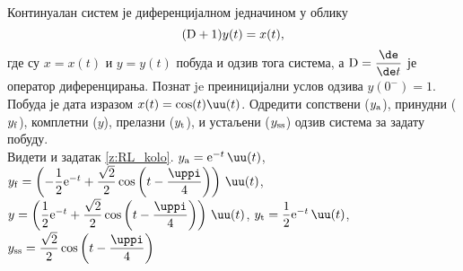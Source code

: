 \PID
Континуалан 
систем је 
диференцијалном једначином у облику 
$$
({\rm D} + 1) y(t) = x(t),
$$ где су 
$x = x(t)$ и $y = y(t)$ побуда и одзив 
тога система, а 
${\rm D} = \dfrac{\de}{\de t}$ је 
оператор диференцирања. 
Познат je преиницијални услов 
одзива $y(0^-) = 1$.
Побуда је дата изразом 
$x(t) = \cos(t) \uu(t)$. Одредити сопствени
($y_{\rm a}$), 
принудни
($y_{\rm f}$), 
комплетни
($y$), 
прелазни
($y_{\rm t}$),
 и устаљени
($y_{\rm ss}$) одзив система за задату побуду.
\\[2mm]

\REZULTAT  Видети и задатак \ref{z:RL_kolo}.
$y_{\rm a} = {\rm e}^{-t} \, \uu(t)$, 
$y_{\rm f} = 
\left( 
-\dfrac{1}{2} {\rm e}^{-t} 
+ \dfrac{\sqrt 2}{2} 
\cos
\left(
t - \dfrac{\uppi}{4}
\right)
\right)\,\uu(t)$, \\
$y = 
\left( 
\dfrac{1}{2} {\rm e}^{-t} 
+ \dfrac{\sqrt 2}{2} 
\cos
\left(
t - \dfrac{\uppi}{4}
\right)
\right)\,\uu(t)
$, 
$
y_{\rm t} = 
\dfrac{1}{2} {\rm e}^{-t} \, \uu(t)
$,
$y_{\rm ss} = 
\dfrac{\sqrt 2}{ 2} 
\cos
\left(
t - \dfrac{\uppi}{4}
\right)
$